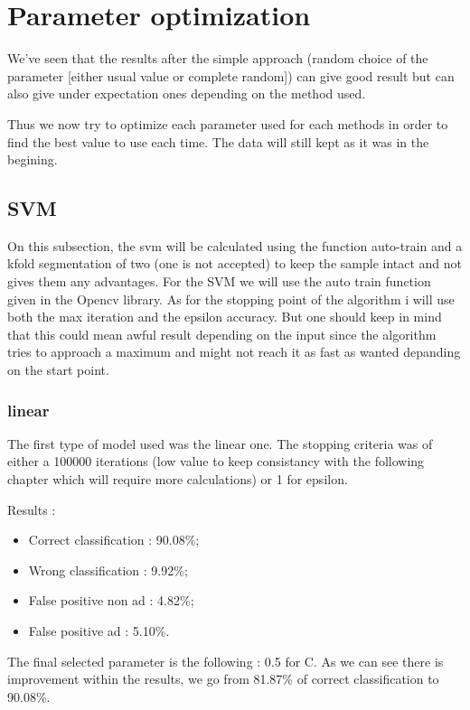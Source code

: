 \section{Parameter optimization}

We've seen that the results after the simple approach (random choice of the parameter [either usual value or complete random]) can give good result but can also give under expectation ones depending on the method used.

Thus we now try to optimize each parameter used for each methods in order to find the best value to use each time. The data will still kept as it was in the begining.

\subsection{SVM}

On this subsection, the svm will be calculated using the function auto-train and a kfold segmentation of two (one is not accepted) to keep the sample intact and not gives them any advantages.
For the SVM we will use the auto train function given in the Opencv library. As for the stopping point of the algorithm i will use both the max iteration and the epsilon accuracy. But one should keep in mind that this could mean awful result depending on the input since the algorithm tries to approach a maximum and might not reach it as fast as wanted depanding on the start point.

\subsubsection{linear}

The first type of model used was the linear one. The stopping criteria was of either a 100000 iterations (low value to keep consistancy with the following chapter which will require more calculations) or 1 for epsilon.

Results :
\begin{itemize}
  \item Correct classification : 90.08\%;
  \item Wrong classification : 9.92\%;
  \item False positive non ad : 4.82\%;
  \item False positive ad : 5.10\%.
\end{itemize}

The final selected parameter is the following : 0.5 for C. As we can see there is improvement within the results, we go from 81.87\% of correct classification to 90.08\%.

